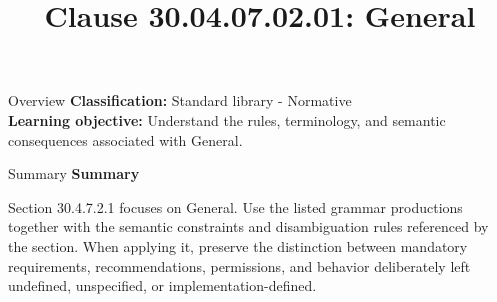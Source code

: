 \documentclass[10pt,letterpaper]{article}
\title{Clause 30.04.07.02.01: General}
\author{}
\date{}
\begin{document}
\maketitle
\begin{CornellOverviewBox}{Overview}
\textbf{Classification:} Standard library - Normative\\[2pt]
\textbf{Learning objective:} Understand the rules, terminology, and semantic consequences associated with General.
\end{CornellOverviewBox}\begin{CornellSummaryBox}{Summary}
{\sffamily\bfseries\color{Accent} Summary}\par\vspace{3pt}Section 30.4.7.2.1 focuses on General. Use the listed grammar productions together with the semantic constraints and disambiguation rules referenced by the section. When applying it, preserve the distinction between mandatory requirements, recommendations, permissions, and behavior deliberately left undefined, unspecified, or implementation-defined.
\end{CornellSummaryBox}
\end{document}
